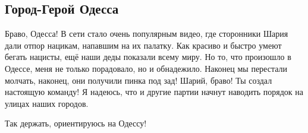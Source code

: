  
 
 

\subsection{Город-Герой Одесса}


Браво, Одесса!  В сети стало очень популярным видео, где сторонники Шария дали
отпор нацикам, напавшим на их палатку. Как красиво и быстро умеют бегать
нацисты, ещё наши деды показали всему миру. Но то, что произошло в Одессе, меня
не только порадовало, но и обнадежило. Наконец мы перестали молчать, наконец,
они получили пинка под зад! Шарий, браво! Ты создал настоящую команду! Я
надеюсь, что и другие партии начнут наводить порядок на улицах наших городов.

Так держать, ориентируюсь на Одессу!


